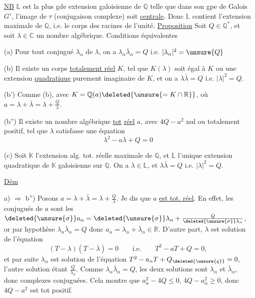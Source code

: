 \uline{NB} $\mathbb L$ est la plus gde extension galoisienne de $\mathbb Q$ telle
que dans son gpe de Galois $G'$, l'image de $\tau$ (conjugaison complexe) soit \uline{centrale}. Donc $\mathbb L$ contient l'extension 
maximale de $\mathbb Q$, i.e. le corps des
racines de l'unité.
\uline{Proposition} Soit $Q\in\mathbb Q^*$, et soit $\lambda\in\mathbb C$ un nombre algébrique.
Conditions équivalentes

(a) Pour tout conjugué $\lambda_\alpha$ de $\lambda$, on a $\lambda_\alpha\bar\lambda_\alpha=Q$ i.e. $|\lambda_\alpha|^2=\unsure{Q}$

(b)  Il existe un corps  \uline{totalement réel} $K$, tel que
 $K(\lambda)$ soit égal à $K$ ou une extension \uline{quadratique} purement
imaginaire de $K$, et on a $\lambda\bar\lambda=Q$ i.e. $|\lambda|^2=Q$.

(b') Comme (b), avec $K=\mathbb Q(a)\deleted{\unsure{=K\cap\mathbb R}}$, où $a=\lambda+\bar\lambda=\lambda+\frac Q\lambda$.

(b'') Il existe un nombre algébrique  \uline{tot} \uline{réel} $a$,
avec  $4Q-a^2$ nul ou totalement
positif, tel que $\lambda$ satisfasse une équation
\[
\lambda^2-a\lambda+Q=0
\]

(c) Soit $\mathbb K$ l'extension alg. tot. réelle maximale de $\mathbb Q$, et
$\mathbb L$ l'unique extension quadratique de $\mathbb K$ galoisienne sur $\mathbb Q$.
On a $\lambda\in\mathbb L$, et \deleted{$\unsure{|\lambda|}$} $\lambda\bar\lambda=Q$ i.e. $|\lambda|^2=Q$.

\uline{Dém}

a) $\Longrightarrow$ b'') Posons $a=\lambda+\bar\lambda=\lambda+\frac Q\lambda$. Je dis que $a$ \uline{est tot. réel}.
En effet, les conjugués de $a$ sont les $\deleted{\unsure{\sigma}}a_\alpha=\deleted{\unsure{\sigma}}\lambda_\alpha+\frac{Q}{\deleted{\unsure{\sigma}}\lambda_\alpha}$, or
par hypothèse $\lambda_\alpha\bar\lambda_\alpha=Q$ donc $a_\alpha=\lambda_\alpha+\bar\lambda_\alpha\in\mathbb R$. D'autre part,
$\lambda$ est solution de l'équation
\[
(T-\lambda)(T-\bar\lambda)=0\qquad\text{i.e.}\qquad T^2-aT+Q=0,
\]
et par suite $\lambda_\alpha$ est solution de l'équation $T^2-a_\alpha T+Q_{\deleted{\unsure{q}}}=0$,
 l'autre solution étant $\frac Q{\lambda_\alpha}$.  Comme
$\lambda_\alpha\bar\lambda_\alpha=Q$, les deux solutions sont $\lambda_\alpha$ et $\bar\lambda_\alpha$, donc complexes
conjuguées. Cela montre que $a_\alpha^2-4Q\le0$,  
$4Q-a_\alpha^2\ge0$, donc $4Q-a^2$ est tot positif.

